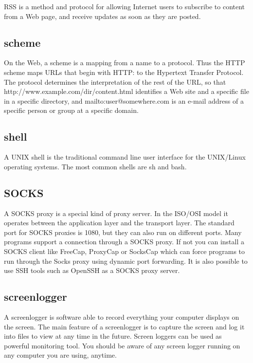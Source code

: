 RSS is a method and protocol for allowing Internet users to subscribe to
content from a Web page, and receive updates as soon as they are posted.

\subsection{scheme}

On the Web, a scheme is a mapping from a name to a protocol. Thus the
HTTP scheme maps URLs that begin with HTTP: to the Hypertext Transfer
Protocol. The protocol determines the interpretation of the rest of the
URL, so that http://www.example.com/dir/content.html identifies a Web
site and a specific file in a specific directory, and
mailto:user@somewhere.com is an e-mail address of a specific person or
group at a specific domain.

\subsection{shell}

A UNIX shell is the traditional command line user interface for the
UNIX/Linux operating systems. The most common shells are sh and bash.

\subsection{SOCKS}

A SOCKS proxy is a special kind of proxy server. In the ISO/OSI model it
operates between the application layer and the transport layer. The
standard port for SOCKS proxies is 1080, but they can also run on
different ports. Many programs support a connection through a SOCKS
proxy. If not you can install a SOCKS client like FreeCap, ProxyCap or
SocksCap which can force programs to run through the Socks proxy using
dynamic port forwarding. It is also possible to use SSH tools such as
OpenSSH as a SOCKS proxy server.

\subsection{screenlogger}

A screenlogger is software able to record everything your computer
displays on the screen. The main feature of a screenlogger is to capture
the screen and log it into files to view at any time in the future.
Screen loggers can be used as powerful monitoring tool. You should be
aware of any screen logger running on any computer you are using,
anytime.

